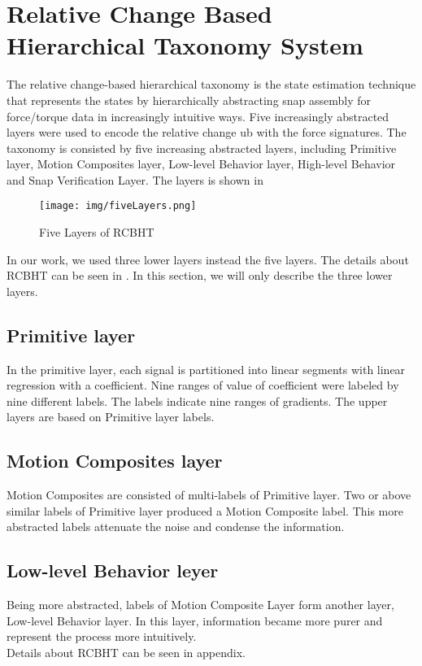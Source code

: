 \section{Relative Change Based Hierarchical Taxonomy System}
The relative change-based hierarchical taxonomy is the state estimation technique that represents the states by hierarchically abstracting snap assembly for force/torque data in increasingly intuitive ways. Five increasingly abstracted layers were used to encode the relative change ub with the force signatures. The taxonomy is consisted by five increasing abstracted layers, including Primitive layer, Motion Composites layer, Low-level Behavior layer, High-level Behavior and Snap Verification Layer. The layers is shown in \\
\begin{figure}[h]
    \centering
    \texttt{[image: img/fiveLayers.png]}
    \caption{Five Layers of RCBHT}
    \label{RCBHT}
\end{figure} 
\indent In our work, we used three lower layers instead the five layers. The details about RCBHT can be seen in \cite{2012IROS-Rojas-RCBHT}. In this section, we will only describe the three lower layers.
\subsection{Primitive layer}
In the primitive layer, each signal is partitioned into linear segments with linear regression with a coefficient. Nine ranges of value of coefficient were labeled by nine different labels. The labels indicate nine ranges of gradients. The upper layers are based on Primitive layer labels.
\subsection{Motion Composites layer}
Motion Composites are consisted of multi-labels of Primitive layer. Two or above similar labels of Primitive layer produced a Motion Composite label. This more abstracted labels attenuate the noise and condense the information.
\subsection{Low-level Behavior leyer}
Being more abstracted, labels of Motion Composite Layer form another layer, Low-level Behavior layer. In this layer, information became more purer and represent the process more intuitively.\\

\indent Details about RCBHT can be seen in appendix.


